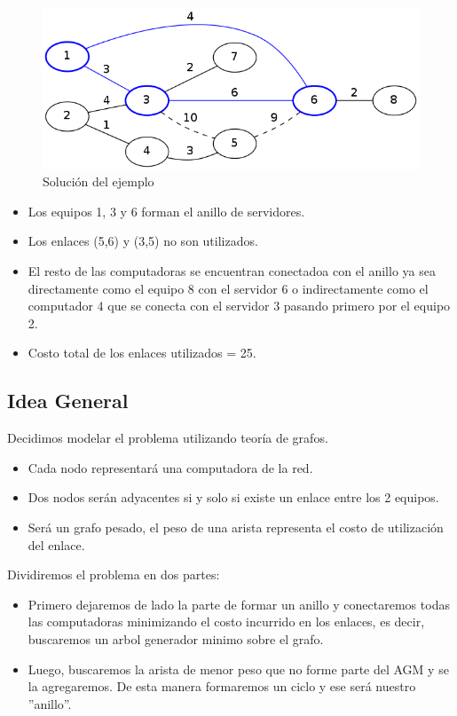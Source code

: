 \begin{figure}[h]
  \centering
    \includegraphics[scale=0.45]{ej3/intro2.png}
  \caption{Soluci\'on del ejemplo}
  \label{fig:ejemplo}
\end{figure}
\begin{itemize}
\item Los equipos 1, 3 y 6 forman el anillo de servidores.
\item Los enlaces (5,6) y (3,5) no son utilizados.
\item El resto de las computadoras se encuentran conectadoa con el anillo ya sea directamente como el equipo 8 con el servidor 6 o indirectamente como el computador 4 que se conecta con el servidor 3 pasando primero por el equipo 2.
\item Costo total de los enlaces utilizados = 25.
\end{itemize}

\subsection{Idea General}

Decidimos modelar el problema utilizando teor\'ia de grafos.
\begin{itemize}
\item Cada nodo representar\'a una computadora de la red.
\item Dos nodos ser\'an adyacentes si y solo si existe un enlace entre los 2 equipos.
\item Ser\'a un grafo pesado, el peso de una arista representa el costo de utilizaci\'on del enlace.
\end{itemize}

Dividiremos el problema en dos partes:
\begin{itemize}
\item Primero dejaremos de lado la parte de formar un anillo y conectaremos todas las computadoras minimizando el costo incurrido en los enlaces, es decir, buscaremos un arbol generador minimo sobre el grafo.
\item Luego, buscaremos la arista de menor peso que no forme parte del AGM y se la agregaremos. De esta manera formaremos un ciclo y ese ser\'a nuestro ''anillo''.
\end{itemize}

